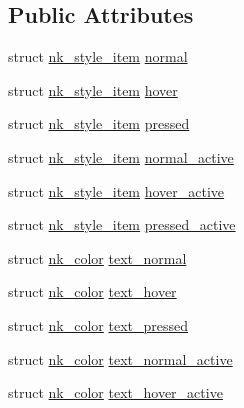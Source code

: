 \subsection*{Public Attributes}
\begin{DoxyCompactItemize}
\item 
struct \mbox{\hyperlink{structnk__style__item}{nk\+\_\+style\+\_\+item}} \mbox{\hyperlink{structnk__style__selectable_ac1d806a8b9e70279bf2c548b867ca3ae}{normal}}
\item 
struct \mbox{\hyperlink{structnk__style__item}{nk\+\_\+style\+\_\+item}} \mbox{\hyperlink{structnk__style__selectable_a4baf84a6176b653b765de870a9295f12}{hover}}
\item 
struct \mbox{\hyperlink{structnk__style__item}{nk\+\_\+style\+\_\+item}} \mbox{\hyperlink{structnk__style__selectable_ae86d07f5a16c62c546c95afddb3ef33d}{pressed}}
\item 
struct \mbox{\hyperlink{structnk__style__item}{nk\+\_\+style\+\_\+item}} \mbox{\hyperlink{structnk__style__selectable_a7e73c516836b8d0574a1b32f8429a0f2}{normal\+\_\+active}}
\item 
struct \mbox{\hyperlink{structnk__style__item}{nk\+\_\+style\+\_\+item}} \mbox{\hyperlink{structnk__style__selectable_a53887479ef54ba2efd0c078ef64fbe4e}{hover\+\_\+active}}
\item 
struct \mbox{\hyperlink{structnk__style__item}{nk\+\_\+style\+\_\+item}} \mbox{\hyperlink{structnk__style__selectable_aefd08007e119a3e321140e31cbfc3f7b}{pressed\+\_\+active}}
\item 
struct \mbox{\hyperlink{structnk__color}{nk\+\_\+color}} \mbox{\hyperlink{structnk__style__selectable_a6a849c9d50abd1dfbbffced1a0283869}{text\+\_\+normal}}
\item 
struct \mbox{\hyperlink{structnk__color}{nk\+\_\+color}} \mbox{\hyperlink{structnk__style__selectable_a1b4e828bbd8ba78ceed9e2efd7c882ba}{text\+\_\+hover}}
\item 
struct \mbox{\hyperlink{structnk__color}{nk\+\_\+color}} \mbox{\hyperlink{structnk__style__selectable_ad96dd5eb1470bbd6cc6e66259e735688}{text\+\_\+pressed}}
\item 
struct \mbox{\hyperlink{structnk__color}{nk\+\_\+color}} \mbox{\hyperlink{structnk__style__selectable_acc546befeecba45c2494c47e2800d5c7}{text\+\_\+normal\+\_\+active}}
\item 
struct \mbox{\hyperlink{structnk__color}{nk\+\_\+color}} \mbox{\hyperlink{structnk__style__selectable_a68320f2eca12232ee4630fb884b389c2}{text\+\_\+hover\+\_\+active}}
\item 

\end{DoxyCompactItemize}
